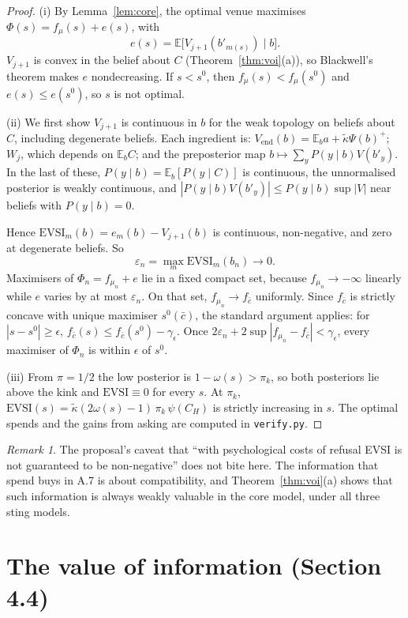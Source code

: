 \documentclass[11pt,a4paper]{article}
\theoremstyle{definition}
\theoremstyle{remark}
\newtheorem{remark}[theorem]{Remark}
\newcommand{\E}{\mathbb{E}}
\newcommand{\Vend}{V_{\mathrm{end}}}
\newcommand{\kt}{\tilde\kappa}
\begin{document}
\begin{proof}
(i) By Lemma~\ref{lem:core}, the optimal venue maximises $\Phi(s)=f_\mu(s)+e(s)$, with
\[
e(s)=\E\bigl[V_{j+1}(b'_{m(s)})\mid b\bigr].
\]
$V_{j+1}$ is convex in the belief about $C$ (Theorem~\ref{thm:voi}(a)), so Blackwell's theorem makes $e$ nondecreasing. If $s<s^0$, then $f_\mu(s)<f_\mu(s^0)$ and $e(s)\le e(s^0)$, so $s$ is not optimal.

(ii) We first show $V_{j+1}$ is continuous in $b$ for the weak topology on beliefs about $C$, including degenerate beliefs. Each ingredient is: $\Vend(b)=\E_b a+\kt\Psi(b)^+$; $W_j$, which depends on $\E_bC$; and the preposterior map $b\mapsto\sum_yP(y\mid b)V(b'_y)$. In the last of these, $P(y\mid b)=\E_b[P(y\mid C)]$ is continuous, the unnormalised posterior is weakly continuous, and $|P(y\mid b)V(b'_y)|\le P(y\mid b)\sup|V|$ near beliefs with $P(y\mid b)=0$.

Hence $\mathrm{EVSI}_m(b)=e_m(b)-V_{j+1}(b)$ is continuous, non-negative, and zero at degenerate beliefs. So
\[
\varepsilon_n=\max_m\mathrm{EVSI}_m(b_n)\to0 .
\]
Maximisers of $\Phi_n=f_{\mu_n}+e$ lie in a fixed compact set, because $f_{\mu_n}\to-\infty$ linearly while $e$ varies by at most $\varepsilon_n$. On that set, $f_{\mu_n}\to f_{\bar c}$ uniformly. Since $f_{\bar c}$ is strictly concave with unique maximiser $s^0(\bar c)$, the standard argument applies: for $|s-s^0|\ge\epsilon$, $f_{\bar c}(s)\le f_{\bar c}(s^0)-\gamma_\epsilon$. Once $2\varepsilon_n+2\sup|f_{\mu_n}-f_{\bar c}|<\gamma_\epsilon$, every maximiser of $\Phi_n$ is within $\epsilon$ of $s^0$.

(iii) From $\pi=1/2$ the low posterior is $1-\omega(s)>\pi_k$, so both posteriors lie above the kink and $\mathrm{EVSI}\equiv0$ for every $s$. At $\pi_k$, $\mathrm{EVSI}(s)=\kt(2\omega(s)-1)\,\pi_k\,\psi(C_H)$ is strictly increasing in $s$. The optimal spends and the gains from asking are computed in \texttt{verify.py}.
\end{proof}

\begin{remark}
The proposal's caveat that ``with psychological costs of refusal EVSI is not guaranteed to be non-negative'' does not bite here. The information that spend buys in A.7 is about compatibility, and Theorem~\ref{thm:voi}(a) shows that such information is always weakly valuable in the core model, under all three sting models.
\end{remark}

\section{The value of information (Section 4.4)}\label{sec:voi}
\end{document}
